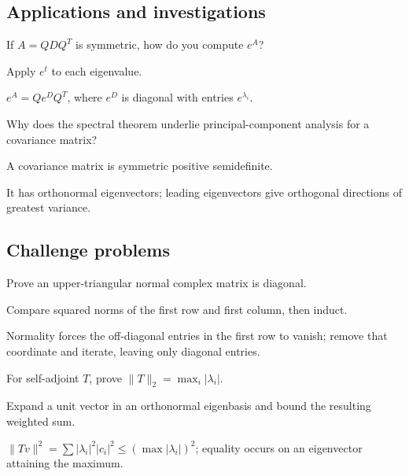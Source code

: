 \subsection*{Applications and investigations}

\begin{exercise}\label{exr:i16-expand-13}
If \(A=QDQ^T\) is symmetric, how do you compute \(e^A\)?
\end{exercise}
\begin{hint}
Apply \(e^t\) to each eigenvalue.
\end{hint}
\begin{solution}
\(e^A=Qe^DQ^T\), where \(e^D\) is diagonal with entries \(e^{\lambda_i}\).
\end{solution}

\begin{exercise}\label{exr:i16-expand-14}
Why does the spectral theorem underlie principal-component analysis for a covariance matrix?
\end{exercise}
\begin{hint}
A covariance matrix is symmetric positive semidefinite.
\end{hint}
\begin{solution}
It has orthonormal eigenvectors; leading eigenvectors give orthogonal directions of greatest variance.
\end{solution}

\subsection*{Challenge problems}

\begin{exercise}\label{exr:i16-expand-15}
Prove an upper-triangular normal complex matrix is diagonal.
\end{exercise}
\begin{hint}
Compare squared norms of the first row and first column, then induct.
\end{hint}
\begin{solution}
Normality forces the off-diagonal entries in the first row to vanish; remove that coordinate and iterate, leaving only diagonal entries.
\end{solution}

\begin{exercise}\label{exr:i16-expand-16}
For self-adjoint \(T\), prove \(\|T\|_2=\max_i|\lambda_i|\).
\end{exercise}
\begin{hint}
Expand a unit vector in an orthonormal eigenbasis and bound the resulting weighted sum.
\end{hint}
\begin{solution}
\(\|Tv\|^2=\sum|\lambda_i|^2|c_i|^2\le(\max|\lambda_i|)^2\); equality occurs on an eigenvector attaining the maximum.
\end{solution}
